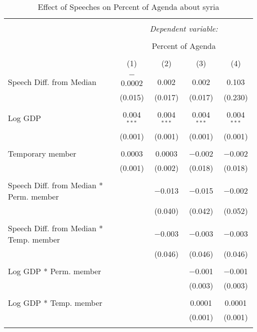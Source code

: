 
\begin{table}[!htbp] \centering 
  \caption{Effect of Speeches on Percent of Agenda about  syria} 
  \label{} 
\begin{tabular}{@{\extracolsep{5pt}}lcccc} 
\\[-1.8ex]\hline 
\hline \\[-1.8ex] 
 & \multicolumn{4}{c}{\textit{Dependent variable:}} \\ 
\cline{2-5} 
\\[-1.8ex] & \multicolumn{4}{c}{Percent of Agenda} \\ 
\\[-1.8ex] & (1) & (2) & (3) & (4)\\ 
\hline \\[-1.8ex] 
 Speech Diff. from Median & $-$0.0002 & 0.002 & 0.002 & 0.103 \\ 
  & (0.015) & (0.017) & (0.017) & (0.230) \\ 
  & & & & \\ 
 Log GDP & 0.004$^{***}$ & 0.004$^{***}$ & 0.004$^{***}$ & 0.004$^{***}$ \\ 
  & (0.001) & (0.001) & (0.001) & (0.001) \\ 
  & & & & \\ 
 Temporary member & 0.0003 & 0.0003 & $-$0.002 & $-$0.002 \\ 
  & (0.001) & (0.002) & (0.018) & (0.018) \\ 
  & & & & \\ 
 Speech Diff. from Median * Perm. member &  & $-$0.013 & $-$0.015 & $-$0.002 \\ 
  &  & (0.040) & (0.042) & (0.052) \\ 
  & & & & \\ 
 Speech Diff. from Median * Temp. member &  & $-$0.003 & $-$0.003 & $-$0.003 \\ 
  &  & (0.046) & (0.046) & (0.046) \\ 
  & & & & \\ 
 Log GDP * Perm. member &  &  & $-$0.001 & $-$0.001 \\ 
  &  &  & (0.003) & (0.003) \\ 
  & & & & \\ 
 Log GDP * Temp. member &  &  & 0.0001 & 0.0001 \\ 
  &  &  & (0.001) & (0.001) \\ 
  & & & & \\ 

\end{tabular}
\end{table}
